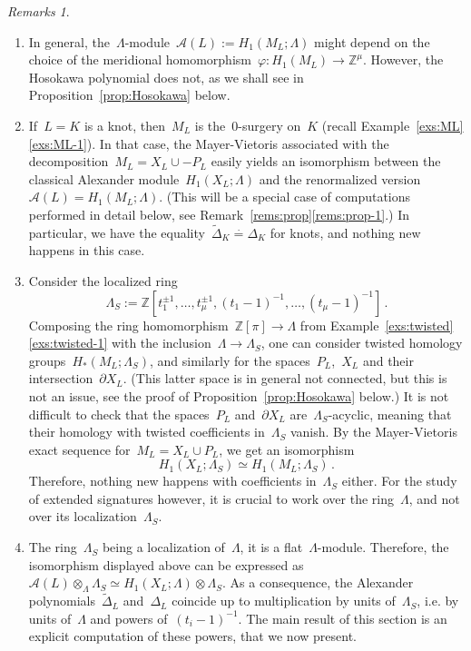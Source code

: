 \documentclass{amsart}
\newcommand{\Z}{\mathbb{Z}}
\newcommand{\A}{\mathcal{A}}
\theoremstyle{definition}
\theoremstyle{remark}
\newtheorem{rems}[thm]{Remarks}
\begin{document}
	\begin{rems}
	\label{rems:Hoso}
	\begin{enumerate}
	\item\label{rems:Hoso-0} In general, the~$\Lambda$-module~$\A(L):=H_1(M_L;\Lambda)$ might depend on the choice of the meridional homomorphism~$\varphi\colon H_1(M_L)\to\Z^\mu$. However, the Hosokawa polynomial
	does not, as we shall see in Proposition~\ref{prop:Hosokawa} below.
	
	\item\label{rems:Hoso-1} If~$L=K$ is a knot, then~$M_L$ is the~0-surgery on~$K$ (recall Example~\ref{exs:ML}\ref{exs:ML-1}). In that case, the Mayer-Vietoris associated with the decomposition~$M_L=X_L\cup -P_L$ easily yields
	an isomorphism between the classical Alexander module~$H_1(X_L;\Lambda)$ and the
	renormalized version~$\A(L)=H_1(M_L;\Lambda)$. (This will be a special case of computations performed in detail below, see Remark~\ref{rems:prop}\ref{rems:prop-1}.) In particular, we have the equality~$\widetilde\Delta_K\stackrel{\cdot}{=}\Delta_K$ for knots,
	and nothing new happens in this case.
	
	\item Consider the localized ring
	\[
	\Lambda_S:=\Z[t_1^{\pm 1},\dots,t_\mu^{\pm 1},(t_1-1)^{-1},\dots,(t_\mu-1)^{-1}]\,.
	\]
	Composing the ring homomorphism~$\Z[\pi]\to\Lambda$ from Example~\ref{exs:twisted}\ref{exs:twisted-1} with the inclusion~$\Lambda\to\Lambda_S$,
	one can consider twisted homology groups~$H_*(M_L;\Lambda_S)$, and similarly for the spaces~$P_L$,~$X_L$
	and their intersection~$\partial X_L$. (This latter space is in general not connected, but this is not an issue,
	see the proof of Proposition~\ref{prop:Hosokawa} below.)
	It is not difficult to check that the spaces~$P_L$ and~$\partial X_L$ are~$\Lambda_S$-acyclic, meaning that
	their homology with twisted coefficients in~$\Lambda_S$ vanish. By the Mayer-Vietoris exact sequence for~$M_L=X_L\cup P_L$, we get an isomorphism
	\[
	H_1(X_L;\Lambda_S)\simeq H_1(M_L;\Lambda_S)\,.
	\]
	Therefore, nothing new happens with coefficients in~$\Lambda_S$ either. For the study of extended signatures however, it is crucial to work over the ring~$\Lambda$, and not over its localization~$\Lambda_S$.
	
	\item The ring~$\Lambda_S$ being a localization of~$\Lambda$, it is a flat~$\Lambda$-module. Therefore,
	the isomorphism displayed above can be expressed as~$\A(L)\otimes_\Lambda\Lambda_S\simeq H_1(X_L;\Lambda)\otimes\Lambda_S$. As a consequence, the Alexander polynomials~$\widetilde\Delta_L$ and~$\Delta_L$ coincide
	up to multiplication by units of~$\Lambda_S$, i.e. by units of~$\Lambda$ and powers of~$(t_i-1)^{-1}$. The main result of this section is an explicit computation of these powers, that we now present.
	\end{enumerate}
	\end{rems}
	
\end{document}
